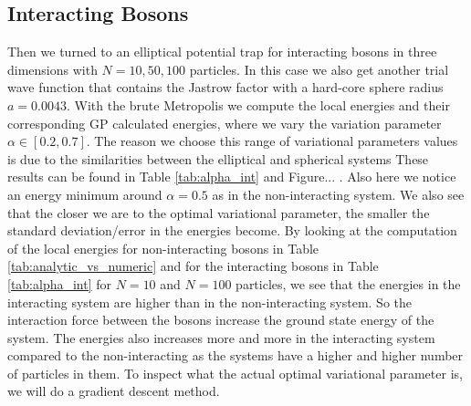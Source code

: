 \documentclass[12pt,a4paper,english]{article}
\begin{document}
\subsection{Interacting Bosons}
\label{subsect:Results_int}
Then we turned to an elliptical potential trap for interacting bosons in three dimensions with $N=10,50,100$ particles. In this case we also get another trial wave function that contains the Jastrow factor with a hard-core sphere radius $a=0.0043$. With the brute Metropolis we compute the local energies and their corresponding GP calculated energies, where we vary the variation parameter $\alpha\in[0.2,0.7]$. The reason we choose this range of variational parameters values is due to the similarities between the elliptical and spherical systems These results can be found in Table \ref{tab:alpha_int} and Figure... . Also here we notice an energy minimum around $\alpha=0.5$ as in the non-interacting system. We also see that the closer we are to the optimal variational parameter, the smaller the standard deviation/error in the energies become. By looking at the computation of the local energies for non-interacting bosons in Table \ref{tab:analytic_vs_numeric} and for the interacting bosons in Table \ref{tab:alpha_int} for $N=10$ and $N=100$ particles, we see that the energies in the interacting system are higher than in the non-interacting system. So the interaction force between the bosons increase the ground state energy of the system. The energies also increases more and more in the interacting system compared to the non-interacting as the systems have a higher and higher number of particles in them. To inspect what the actual optimal variational parameter is, we will do a gradient descent method.
\end{document}
